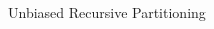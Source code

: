 \documentclass[10pt,compress,t,notes=noshow, xcolor=table]{beamer}
\begin{document}
\begin{frame}{Unbiased Recursive Partitioning}
\begin{columns}[T, totalwidth = \textwidth]
\begin{column}{0.5\textwidth}
    \end{column}
\end{columns}
    
    
    

\end{frame}
\end{document}
